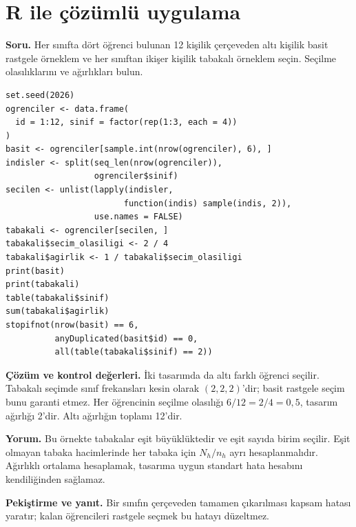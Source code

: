 \section{R ile çözümlü uygulama}
\label{sec:r-b06}

\textbf{Soru.} Her sınıfta dört öğrenci bulunan 12 kişilik çerçeveden altı
kişilik basit rastgele örneklem ve her sınıftan ikişer kişilik tabakalı
örneklem seçin. Seçilme olasılıklarını ve ağırlıkları bulun.

\begin{lstlisting}[style=prismR]
set.seed(2026)
ogrenciler <- data.frame(
  id = 1:12, sinif = factor(rep(1:3, each = 4))
)
basit <- ogrenciler[sample.int(nrow(ogrenciler), 6), ]
indisler <- split(seq_len(nrow(ogrenciler)),
                  ogrenciler$sinif)
secilen <- unlist(lapply(indisler,
                        function(indis) sample(indis, 2)),
                  use.names = FALSE)
tabakali <- ogrenciler[secilen, ]
tabakali$secim_olasiligi <- 2 / 4
tabakali$agirlik <- 1 / tabakali$secim_olasiligi
print(basit)
print(tabakali)
table(tabakali$sinif)
sum(tabakali$agirlik)
stopifnot(nrow(basit) == 6,
          anyDuplicated(basit$id) == 0,
          all(table(tabakali$sinif) == 2))
\end{lstlisting}

\begin{outputguidebox}
\textbf{Çözüm ve kontrol değerleri.} İki tasarımda da altı farklı öğrenci
seçilir. Tabakalı seçimde sınıf frekansları kesin olarak $(2,2,2)$'dir;
basit rastgele seçim bunu garanti etmez. Her öğrencinin seçilme olasılığı
$6/12=2/4=0{,}5$, tasarım ağırlığı 2'dir. Altı ağırlığın toplamı 12'dir.
\end{outputguidebox}

\textbf{Yorum.} Bu örnekte tabakalar eşit büyüklüktedir ve eşit sayıda
birim seçilir. Eşit olmayan tabaka hacimlerinde her tabaka için $N_h/n_h$
ayrı hesaplanmalıdır. Ağırlıklı ortalama hesaplamak, tasarıma uygun standart
hata hesabını kendiliğinden sağlamaz.

\textbf{Pekiştirme ve yanıt.} Bir sınıfın çerçeveden tamamen çıkarılması
kapsam hatası yaratır; kalan öğrencileri rastgele seçmek bu hatayı düzeltmez.